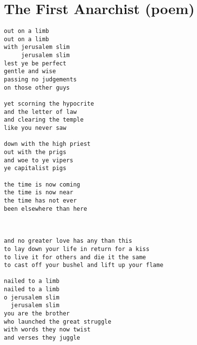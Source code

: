 \chapter{The First Anarchist (poem)}

\begin{verbatim}
out on a limb
out on a limb
with jerusalem slim
     jerusalem slim
lest ye be perfect
gentle and wise
passing no judgements
on those other guys

yet scorning the hypocrite
and the letter of law
and clearing the temple
like you never saw

down with the high priest
out with the prigs
and woe to ye vipers
ye capitalist pigs

the time is now coming
the time is now near
the time has not ever
been elsewhere than here



and no greater love has any than this
to lay down your life in return for a kiss
to live it for others and die it the same
to cast off your bushel and lift up your flame

nailed to a limb
nailed to a limb
o jerusalem slim
  jerusalem slim
you are the brother
who launched the great struggle
with words they now twist
and verses they juggle
\end{verbatim}